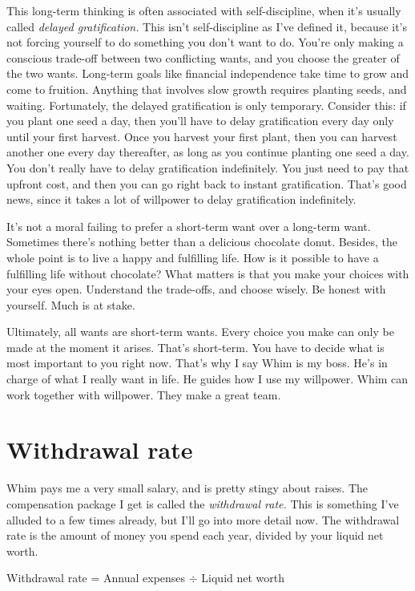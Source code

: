 This long-term thinking is often associated with self-discipline, when it's usually called \emph{delayed gratification.} This isn't self-discipline as I've defined it, because it's not forcing yourself to do something you don't want to do. You're only making a conscious trade-off between two conflicting wants, and you choose the greater of the two wants. Long-term goals like financial independence take time to grow and come to fruition. Anything that involves slow growth requires planting seeds, and waiting. Fortunately, the delayed gratification is only temporary. Consider this: if you plant one seed a day, then you'll have to delay gratification every day only until your first harvest. Once you harvest your first plant, then you can harvest another one every day thereafter, as long as you continue planting one seed a day. You don't really have to delay gratification indefinitely. You just need to pay that upfront cost, and then you can go right back to instant gratification. That's good news, since it takes a lot of willpower to delay gratification indefinitely.

It's not a moral failing to prefer a short-term want over a long-term want. Sometimes there's nothing better than a delicious chocolate donut. Besides, the whole point is to live a happy and fulfilling life. How is it possible to have a fulfilling life without chocolate? What matters is that you make your choices with your eyes open. Understand the trade-offs, and choose wisely. Be honest with yourself. Much is at stake.

Ultimately, all wants are short-term wants. Every choice you make can only be made at the moment it arises. That's short-term. You have to decide what is most important to you right now. That's why I say Whim is my boss. He's in charge of what I really want in life. He guides how I use my willpower. Whim can work together with willpower. They make a great team.

\section{Withdrawal rate}
Whim pays me a very small salary, and is pretty stingy about raises. The compensation package I get is called the \emph{withdrawal rate.} This is something I've alluded to a few times already, but I'll go into more detail now. The withdrawal rate is the amount of money you spend each year, divided by your liquid net worth.

\begin{center}
Withdrawal rate = Annual expenses $\div$ Liquid net worth
\end{center}

